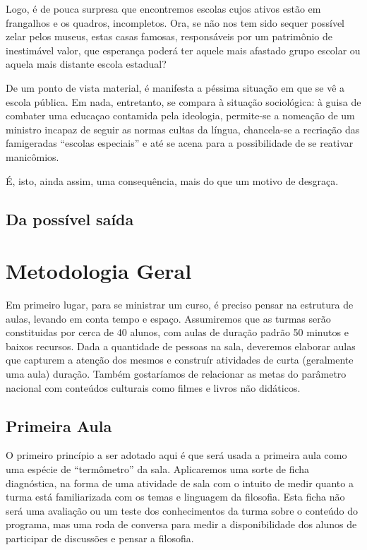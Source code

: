 \documentclass[12pt,a4paper]{article}
\begin{document}
	Logo, é de pouca surpresa que encontremos escolas cujos ativos estão 
	em frangalhos e os quadros, incompletos. Ora, se não nos tem sido 
	sequer possível zelar pelos museus, estas casas famosas, responsáveis 
	por um patrimônio de inestimável valor, que esperança poderá ter 
	aquele mais afastado grupo escolar ou aquela mais distante escola 
	estadual? 

	De um ponto de vista material, é manifesta a péssima situação em 
	que se vê a escola pública. Em nada, entretanto, se compara à 
	situação sociológica: à guisa de combater uma educaçao contamida 
	pela ideologia, permite-se a nomeação de um ministro incapaz de 
	seguir as normas cultas da língua, chancela-se a recriação das 
	famigeradas “escolas especiais” e até se acena para a 
	possibilidade de se reativar manicômios. 

	É, isto, ainda assim, uma consequência, mais do que um motivo de 
	desgraça. 

	\subsection*{Da possível saída}

	\newpage
	
	\section{Metodologia Geral}
	
	Em primeiro lugar, para se ministrar um curso, é preciso pensar na 
	estrutura de aulas, levando em conta tempo e espaço. Assumiremos que 
	as turmas serão constituidas por cerca de 40 alunos, com aulas de 
	duração padrão 50 minutos e baixos recursos. Dada a quantidade de 
	pessoas na sala, deveremos elaborar aulas que capturem a atenção dos 
	mesmos e construír atividades de curta (geralmente uma aula) duração.
	Também gostaríamos de relacionar as metas do parâmetro nacional com 
	conteúdos culturais como filmes e livros não didáticos.	

	\subsection*{Primeira Aula}

	O primeiro princípio a ser adotado aqui é que será usada a primeira aula 
	como uma espécie de ``termômetro'' da sala. Aplicaremos uma sorte de 
	ficha diagnóstica, na forma de uma atividade de sala com o intuito 
	de medir quanto a turma está familiarizada com os temas e linguagem 
	da filosofia. Esta ficha não será uma avaliação ou um teste dos 
	conhecimentos da turma sobre o conteúdo do programa, mas uma roda de 
	conversa para medir a disponibilidade dos alunos de participar de 
	discussões e pensar a filosofia. 
	
\end{document}
